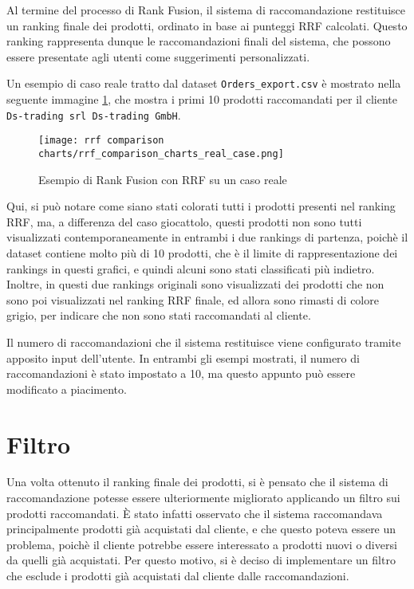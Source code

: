 Al termine del processo di Rank Fusion, il sistema di raccomandazione restituisce un ranking finale dei prodotti, ordinato in base ai punteggi RRF calcolati. Questo ranking rappresenta dunque le raccomandazioni finali del sistema, che possono essere presentate agli utenti come suggerimenti personalizzati.

Un esempio di caso reale tratto dal dataset \texttt{Orders\_export.csv} è mostrato nella seguente immagine \ref{fig:rank-fusion-real-case}, che mostra i primi 10 prodotti raccomandati per il cliente \texttt{Ds-trading srl Ds-trading GmbH}.

\begin{figure}[h]
    \centering
    \texttt{[image: rrf comparison charts/rrf\_comparison\_charts\_real\_case.png]}
    \caption{Esempio di Rank Fusion con RRF su un caso reale}
    \label{fig:rank-fusion-real-case}
\end{figure}

Qui, si può notare come siano stati colorati tutti i prodotti presenti nel ranking RRF, ma, a differenza del caso giocattolo, questi prodotti non sono tutti visualizzati contemporaneamente in entrambi i due rankings di partenza, poichè il dataset contiene molto più di 10 prodotti, che è il limite di rappresentazione dei rankings in questi grafici, e quindi alcuni sono stati classificati più indietro. Inoltre, in questi due rankings originali sono visualizzati dei prodotti che non sono poi visualizzati nel ranking RRF finale, ed allora sono rimasti di colore grigio, per indicare che non sono stati raccomandati al cliente.

Il numero di raccomandazioni che il sistema restituisce viene configurato tramite apposito input dell'utente. In entrambi gli esempi mostrati, il numero di raccomandazioni è stato impostato a 10, ma questo appunto può essere modificato a piacimento.


\section{Filtro}

Una volta ottenuto il ranking finale dei prodotti, si è pensato che il sistema di raccomandazione potesse essere ulteriormente migliorato applicando un filtro sui prodotti raccomandati. È stato infatti osservato che il sistema raccomandava principalmente prodotti già acquistati dal cliente, e che questo poteva essere un problema, poichè il cliente potrebbe essere interessato a prodotti nuovi o diversi da quelli già acquistati. Per questo motivo, si è deciso di implementare un filtro che esclude i prodotti già acquistati dal cliente dalle raccomandazioni.


